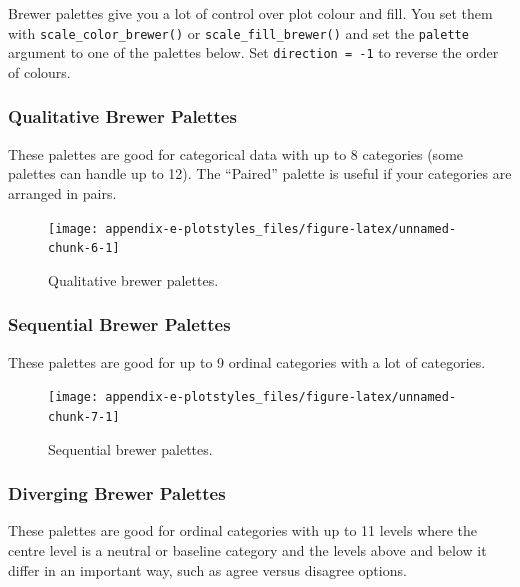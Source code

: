 \documentclass[
  oneside]{book}
\begin{document}
Brewer palettes give you a lot of control over plot colour and fill. You set them with \texttt{scale\_color\_brewer()} or \texttt{scale\_fill\_brewer()} and set the \texttt{palette} argument to one of the palettes below. Set \texttt{direction\ =\ -1} to reverse the order of colours.

\hypertarget{qualitative-brewer-palettes}{%
\subsubsection{Qualitative Brewer Palettes}\label{qualitative-brewer-palettes}}

These palettes are good for categorical data with up to 8 categories (some palettes can handle up to 12). The ``Paired'' palette is useful if your categories are arranged in pairs.

\begin{figure}

{\centering \texttt{[image: appendix-e-plotstyles\_files/figure-latex/unnamed-chunk-6-1]} 

}

\caption{Qualitative brewer palettes.}\label{fig:unnamed-chunk-6}
\end{figure}

\hypertarget{sequential-brewer-palettes}{%
\subsubsection{Sequential Brewer Palettes}\label{sequential-brewer-palettes}}

These palettes are good for up to 9 ordinal categories with a lot of categories.

\begin{figure}

{\centering \texttt{[image: appendix-e-plotstyles\_files/figure-latex/unnamed-chunk-7-1]} 

}

\caption{Sequential brewer palettes.}\label{fig:unnamed-chunk-7}
\end{figure}

\hypertarget{diverging-brewer-palettes}{%
\subsubsection{Diverging Brewer Palettes}\label{diverging-brewer-palettes}}

These palettes are good for ordinal categories with up to 11 levels where the centre level is a neutral or baseline category and the levels above and below it differ in an important way, such as agree versus disagree options.
\end{document}
